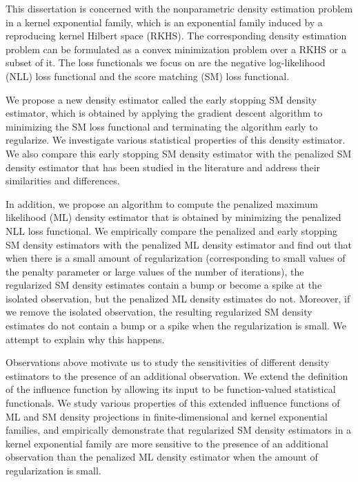
This dissertation is concerned with the nonparametric density estimation problem in a kernel exponential family, which is an exponential family induced by a reproducing kernel Hilbert space (RKHS). The corresponding density estimation problem can be formulated as a convex minimization problem over a RKHS or a subset of it. The loss functionals we focus on are the negative log-likelihood (NLL) loss functional and the score matching (SM) loss functional. 

We propose a new density estimator called the early stopping SM density estimator, which is obtained by applying the gradient descent algorithm to minimizing the SM loss functional and terminating the algorithm early to regularize. We investigate various statistical properties of this density estimator. We also compare this early stopping SM density estimator with the penalized SM density estimator that has been studied in the literature and address their similarities and differences. 

In addition, we propose an algorithm to compute the penalized maximum likelihood (ML) density estimator that is obtained by minimizing the penalized NLL loss functional. We empirically compare the penalized and early stopping SM density estimators with the penalized ML density estimator and find out that when there is a small amount of regularization (corresponding to small values of the penalty parameter or large values of the number of iterations), the regularized SM density estimates contain a bump or become a spike at the isolated observation, but the penalized ML density estimates do not. Moreover, if we remove the isolated observation, the resulting regularized SM density estimates do not contain a bump or a spike when the regularization is small. We attempt to explain why this happens. 

Observations above motivate us to study the sensitivities of different density estimators to the presence of an additional observation. We extend the definition of the influence function by allowing its input to be function-valued statistical functionals. We study various properties of this extended influence functions of ML and SM density projections in finite-dimensional and kernel exponential families, and empirically demonstrate that regularized SM density estimators in a kernel exponential family are more sensitive to the presence of an additional observation than the penalized ML density estimator when the amount of regularization is small. 
